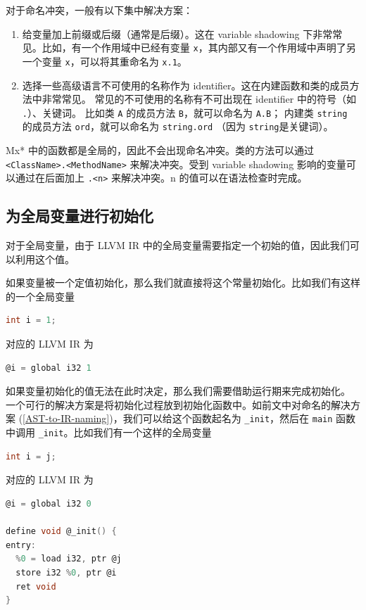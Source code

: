 对于命名冲突，一般有以下集中解决方案：
\begin{enumerate}
 \item 给变量加上前缀或后缀（通常是后缀）。这在 variable shadowing 下非常常见。比如，有一个作用域中已经有变量
   \texttt x，其内部又有一个作用域中声明了另一个变量 \texttt x，可以将其重命名为
   \texttt{x.1}。
 \item 选择一些高级语言不可使用的名称作为 identifier。这在内建函数和类的成员方法中非常常见。
   常见的不可使用的名称有不可出现在 identifier 中的符号（如 \texttt{.}）、关键词。
   比如类 \texttt A 的成员方法 \texttt{B}，就可以命名为 \texttt{A.B}；
   内建类 \texttt{string} 的成员方法 \texttt{ord}，就可以命名为 \texttt{string.ord}
   （因为 \texttt{string}是关键词）。
\end{enumerate}

Mx* 中的函数都是全局的，因此不会出现命名冲突。类的方法可以通过
\texttt{<ClassName>.<MethodName>} 来解决冲突。受到 variable shadowing
影响的变量可以通过在后面加上 \texttt{.<n>} 来解决冲突。n 的值可以在语法检查时完成。

\subsection{为全局变量进行初始化}\label{AST-to-IR-initializing}

对于全局变量，由于 LLVM IR 中的全局变量需要指定一个初始的值，因此我们可以利用这个值。

如果变量被一个定值初始化，那么我们就直接将这个常量初始化。比如我们有这样的一个全局变量
\begin{lstlisting}[language=C]
int i = 1;
\end{lstlisting}
对应的 LLVM IR 为
\begin{lstlisting}[language=C]
@i = global i32 1
\end{lstlisting}

如果变量初始化的值无法在此时决定，那么我们需要借助运行期来完成初始化。
一个可行的解决方案是将初始化过程放到初始化函数中。如前文中对命名的解决方案
(\ref{AST-to-IR-naming})，我们可以给这个函数起名为 \texttt{\_init}，然后在
\texttt{main} 函数中调用 \texttt{\_init}。比如我们有一个这样的全局变量
\begin{lstlisting}[language=C]
int i = j;
\end{lstlisting}
对应的 LLVM IR 为
\begin{lstlisting}[language=C]
@i = global i32 0

define void @_init() {
entry:
  %0 = load i32, ptr @j
  store i32 %0, ptr @i
  ret void
}
\end{lstlisting}

